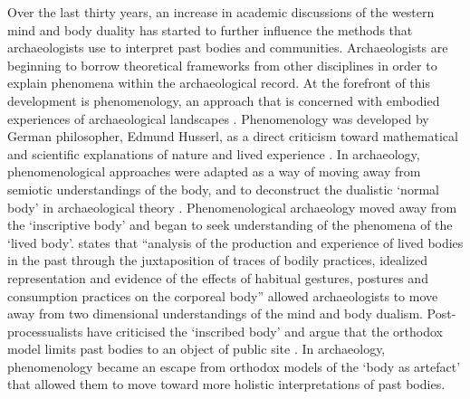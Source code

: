 	Over the last thirty years, an increase in academic discussions of the western mind and body duality has started to further influence the methods that archaeologists use to interpret past bodies and communities. Archaeologists are beginning to borrow theoretical frameworks from other disciplines in order to explain phenomena within the archaeological record. At the forefront of this development is phenomenology, an approach that is concerned with embodied experiences of archaeological landscapes \parencites{Copeland_2009}{Tilley_1994}. Phenomenology was developed by German philosopher, Edmund Husserl, as a direct criticism toward mathematical and scientific explanations of nature and lived experience \parencite[321]{Allsobrook_2014}. In archaeology, phenomenological approaches were adapted as a way of moving away from semiotic understandings of the body, and to deconstruct the dualistic ‘normal body’ in archaeological theory \parencite[65] {Bruck_2005}. Phenomenological archaeology moved away from the ‘inscriptive body’ and began to seek understanding of the phenomena of the ‘lived body’. \textcite [139]{Joyce_2005} states that “analysis of the production and experience of lived bodies in the past through the juxtaposition of traces of bodily practices, idealized representation and evidence of the effects of habitual gestures, postures and consumption practices on the corporeal body” allowed archaeologists to move away from two dimensional understandings of the mind and body dualism. Post-processualists have criticised the ‘inscribed body’ and argue that the orthodox model limits past bodies to an object of public site \parencites {Grosz_1994}{Joyce_2005}{Tilley_1994}. In archaeology, phenomenology became an escape from orthodox models of the ‘body as artefact’ that allowed them to move toward more holistic interpretations of past bodies.

